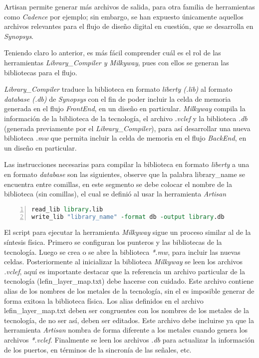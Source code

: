 Artisan permite generar más archivos de salida, para otra familia de herramientas como \textit{Cadence} por ejemplo; sin embargo, se han expuesto únicamente aquellos archivos relevantes para el flujo de diseño digital en cuestión, que se desarrolla en \textit{Synopsys}.

Teniendo claro lo anterior, es más fácil comprender cuál es el rol de las herramientas \textit{Library\_Compiler y Milkyway}, pues con ellos se generan las bibliotecas para el flujo.

\textit{Library\_Compiler} traduce la biblioteca en formato \textit{liberty (.lib)} al formato \textit{database (.db)} de \textit{Synopsys} con el fin de poder incluir la celda de memoria generada en el flujo \textit{FrontEnd}, en un diseño en particular. \textit{Milkyway} compila la información de la biblioteca de la tecnología, el archivo \textit{.vclef} y la biblioteca \textit{.db} (generada previamente por el \textit{Library\_Compiler}), para así desarrollar una nueva biblioteca \textit{.mw} que permita incluir la celda de memoria en el flujo \textit{BackEnd}, en un diseño en particular.

Las instrucciones necesarias para compilar la biblioteca en formato \textit{liberty} a una en formato \textit{database} son las siguientes, observe que la palabra library\_name se encuentra entre comillas, en este segmento se debe colocar el nombre de la biblioteca (sin comillas), el cual se definió al usar la herramienta \textit{Artisan}

\begin{lstlisting}[language= tcl, numbers=left, keywordstyle=\color{blue}, commentstyle=\color{mygreen}]
read_lib library.lib
write_lib "library_name" -format db -output library.db
\end{lstlisting}


El script para ejecutar la herramienta \textit{Milkyway} sigue un proceso similar al de la síntesis física. Primero se configuran los punteros y las bibliotecas de la tecnología. Luego se crea o se abre la biblioteca \textit{*.mw}, para incluir las nuevas celdas. Posteriormente al inicializar la biblioteca \textit{Milkyway} se leen los archivos \textit{.vclef}, aquí es importante destacar que la referencia un archivo particular de la tecnología (lefin\_layer\_map.txt) debe hacerse con cuidado. Este archivo contiene alias de los nombres de los metales de la tecnología, sin el es imposible generar de forma exitosa la biblioteca física. Los alias definidos en el archivo lefin\_layer\_map.txt deben ser congruentes con los nombres de los metales de la tecnología, de no ser así, deben ser editados. Este archivo debe incluirse ya que la herramienta \textit{Artisan} nombra de forma diferente a los metales cuando genera los archivos \textit{*.vclef}. Finalmente se leen los archivos \textit{.db} para actualizar la información de los puertos, en términos de la sincronía de las señales, etc. 

